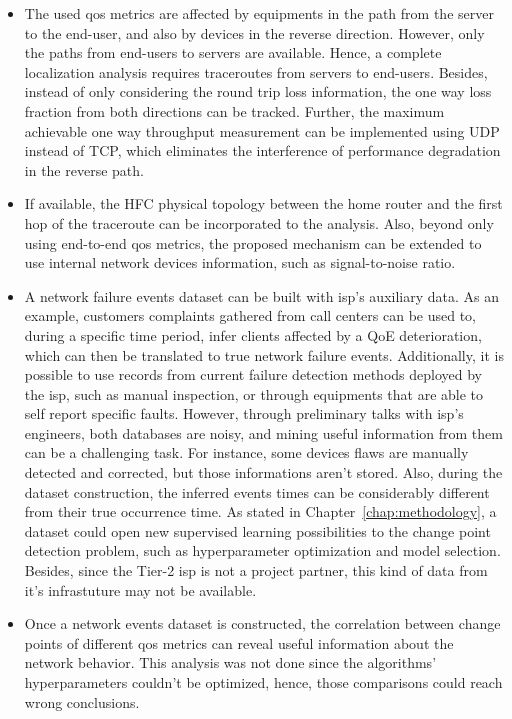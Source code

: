 \begin{itemize}
\item
The used \gls*{qos} metrics are affected by equipments in the path from the server to
the end-user, and also by devices in the reverse direction.
However, only the paths from end-users to servers are available.
Hence, a complete
localization analysis requires traceroutes from servers to end-users.
Besides, instead of only considering the round trip loss information,
the one way loss fraction from both directions can be tracked.
Further, the maximum achievable one way throughput measurement can be
implemented using UDP instead of TCP, which eliminates the interference of
performance degradation in the reverse path.

\item
If available, the HFC physical topology between the home router and the
first hop of the traceroute can be incorporated to the analysis.
Also, beyond only using end-to-end \gls*{qos} metrics,
the proposed mechanism can be extended
to use internal network devices information, such as signal-to-noise ratio.

\item
A network failure events dataset can be built with \gls*{isp}'s auxiliary data.
As an example, customers complaints gathered from call centers can be used to,
during a specific time period, infer clients affected by a QoE deterioration,
which can then be translated to true network failure events.
Additionally, it is possible to use records from current failure detection
methods deployed by the \gls*{isp}, such as manual inspection, or through equipments
that are able to self report specific faults.
However, through preliminary talks with \gls*{isp}'s engineers,
both databases are noisy, and mining useful information
from them can be a challenging task.
For instance, some devices flaws are manually
detected and corrected, but those informations aren't stored.
Also, during the dataset construction, the inferred events times can be
considerably different from their true occurrence time.
As stated in Chapter~\ref{chap:methodology}, a dataset could open new
supervised learning possibilities to the change point detection problem, such
as hyperparameter optimization and model selection.
Besides, since the Tier-2 \gls*{isp} is not a project partner, this kind of data from
it's infrastuture may not be available.

\item
Once a network events dataset is constructed, the correlation between
change points of different \gls*{qos} metrics can reveal useful information
about the network behavior. This analysis was not done since the algorithms'
hyperparameters couldn't be optimized, hence, those comparisons could reach
wrong conclusions.


\end{itemize}
